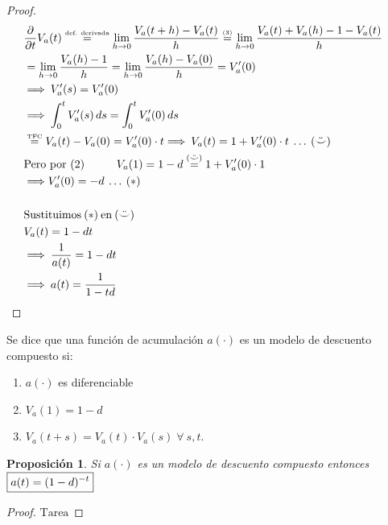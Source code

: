 \documentclass[
]{book}
\newtheorem{proposition}{Proposición}[chapter]
\theoremstyle{definition}
\theoremstyle{definition}
\theoremstyle{definition}
\theoremstyle{definition}
\theoremstyle{remark}
\begin{document}
\begin{proof}
\begin{align*}
&\frac{\partial}{\partial t} V_a(t) \mathrel{\stackrel{\scriptscriptstyle \text{def. derivada}}{=}} \lim_{h \to 0} \frac{V_a(t+h) - V_a(t)}{h} \mathrel{\stackrel{\scriptscriptstyle \text{(3)}}{=}} \lim_{h \to 0} \frac{V_a(t) + V_a(h) -1 - V_a(t)}{h}\\
& = \lim_{h \to 0} \frac{V_a(h)-1}{h} = \lim_{h \to 0} \frac{V_a(h) - V_a(0)}{h} = V_a'(0)\\
& \Longrightarrow\: V_a'(s) = V'_a(0)\\
& \Longrightarrow\: \int_{0}^{t} V_a'(s) \, ds  = \int_{0}^{t} V_a'(0) \, ds\\
& \mathrel{\stackrel{\scriptscriptstyle \text{TFC}}{=}} V_a(t) - V_a(0) = V_a'(0)\cdot t \Longrightarrow\: V_a(t) = 1 + V_a'(0)\cdot t \: \ldots \: (\ddot\smile)\\
&\text{Pero por (2)} \hspace{1cm} V_a(1) = 1-d \mathrel{\stackrel{(\ddot\smile)}{=}} 1 + V_a'(0) \cdot 1\\
&\Longrightarrow V_a'(0) = -d \: \ldots \: (*)\\
&\hfill&\\
&\text{Sustituimos} \: (*)\: \text{en} \: (\ddot\smile)\\
& V_a(t) = 1-dt\\
&\Longrightarrow\: \frac{1}{a(t)} = 1 -dt\\
&\Longrightarrow\: a(t) = \frac{1}{1-td}   
\end{align*}
\end{proof}

Se dice que una función de acumulación \(a(\cdot)\) es un {modelo de descuento compuesto} si:

\begin{enumerate}
\def\labelenumi{(\arabic{enumi})}
\item
  \(a(\cdot)\) es diferenciable
\item
  \(V_a(1) = 1-d\)
\item
  \(V_a(t+s) = V_a(t)\cdot V_a(s) \; \forall \: s,t\).
\end{enumerate}

\begin{proposition}
Si \(a(\cdot)\) es un {modelo de descuento compuesto} entonces \(\boxed{\color{black}a(t) = (1-d)^{-t}}\)
\end{proposition}

\begin{proof}
{\(\boxed{\text{Tarea}}\)}
\end{proof}
\end{document}
